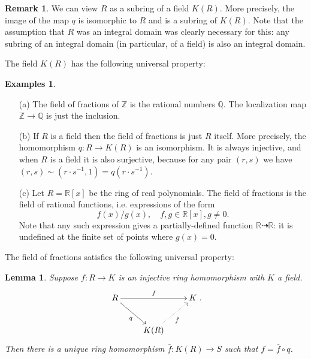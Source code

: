\documentclass [12pt,oneside,a4paper,mathscr]{amsart}
\newtheorem{lemma}[thm]{Lemma}
\theoremstyle{definition}
\newtheorem{remark}[thm]{Remark}
\newtheorem{examples}[thm]{Examples}
\newcommand{\Q}{\mathbb{Q}}
\newcommand{\R}{\mathbb{R}}
\newcommand{\Z}{\mathbb Z}
\begin{document}
\begin{remark}
We can view $R$ as a subring of a field $K(R)$. More precisely, the image of the map $q$ is isomorphic to $R$ and is a subring of $K(R)$.  Note that the assumption that $R$ was an integral domain was clearly necessary for this: any subring of an integral domain (in particular, of a field)  is also an integral domain.
\end{remark}

The field $K(R)$ has the following universal property:

\begin{examples}
\begin{itemize}
\item[(a)] The field of fractions of $\Z$ is the rational numbers $\Q$. The localization map $\Z \to \Q$ is just the inclusion.
\smallskip

\item[(b)] If $R$ is a field then the field of fractions is just $R$ itself. More precisely, the homomorphism $q\colon R \to K(R)$ is an isomorphism. It is always injective, and when $R$ is a field it is also surjective, because for any pair $(r,s)$ we have $(r,s)\sim (r \cdot s^{-1},1)=q(r  \cdot s^{-1})$.
\smallskip

\item[(c)] Let $R=\R[x]$ be the ring of real polynomials. The field of fractions is the field of rational functions, i.e. expressions of the form
\[f(x)/g(x), \quad f,g\in \R[x], g\neq 0.\]
Note that any such expression gives a partially-defined function $\R \dashrightarrow \R$: it is undefined at the finite set of points where $g(x)=0$.
\end{itemize}
\end{examples}

The field of fractions satisfies the following universal property:

\begin{lemma}
Suppose $f\colon R \to K$ is an injective ring homomorphism with $K$ a field.
\[\xymatrix{ R \ar@{>}[rr]^{f} \ar@{>}[dr]_{q} && K \\ &K(R) \ar@{..>}[ur]_{\bar{f}}}.\]
Then there is a unique ring homomorphism $\bar{f}\colon K(R) \to S$ such that $f=\bar{f}\circ q$.
\end{lemma}
\end{document}
